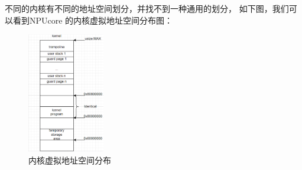 不同的内核有不同的地址空间划分，并找不到一种通用的划分， 如下图，我们可以看到NPUcore 的内核虚拟地址空间分布图：
\begin{figure}[h]
	\centering
	\includegraphics[width=0.3\textwidth]{figures/04-02-内核虚拟地址空间分布.png}
	\caption{内核虚拟地址空间分布}
\end{figure}

